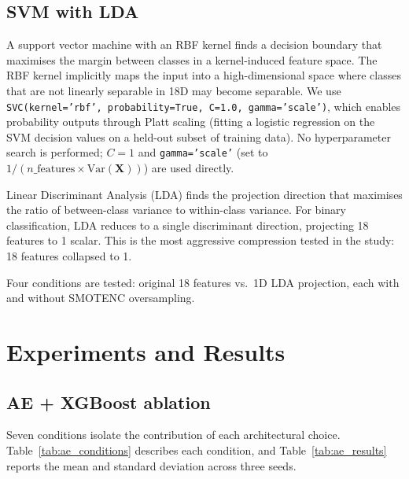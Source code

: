 \documentclass[12pt,a4paper]{article}
\begin{document}
\subsection{SVM with LDA}

A support vector machine with an RBF kernel finds a decision boundary that
maximises the margin between classes in a kernel-induced feature space. The
RBF kernel implicitly maps the input into a high-dimensional space where
classes that are not linearly separable in 18D may become separable. We
use \texttt{SVC(kernel='rbf', probability=True, C=1.0, gamma='scale')},
which enables probability outputs through Platt scaling (fitting a logistic
regression on the SVM decision values on a held-out subset of training data).
No hyperparameter search is performed; $C = 1$ and \texttt{gamma='scale'}
(set to $1/(n\_\text{features} \times \text{Var}(\mathbf{X}))$) are used
directly.

Linear Discriminant Analysis (LDA) finds the projection direction that
maximises the ratio of between-class variance to within-class variance. For
binary classification, LDA reduces to a single discriminant direction,
projecting 18 features to 1 scalar. This is the most aggressive compression
tested in the study: 18 features collapsed to 1.

Four conditions are tested: original 18 features vs.\ 1D LDA projection,
each with and without SMOTENC oversampling.

\section{Experiments and Results}
\label{sec:results}

\subsection{AE + XGBoost ablation}
\label{sec:ae_ablation}

Seven conditions isolate the contribution of each architectural choice.
Table~\ref{tab:ae_conditions} describes each condition, and
Table~\ref{tab:ae_results} reports the mean and standard deviation across
three seeds.
\end{document}
